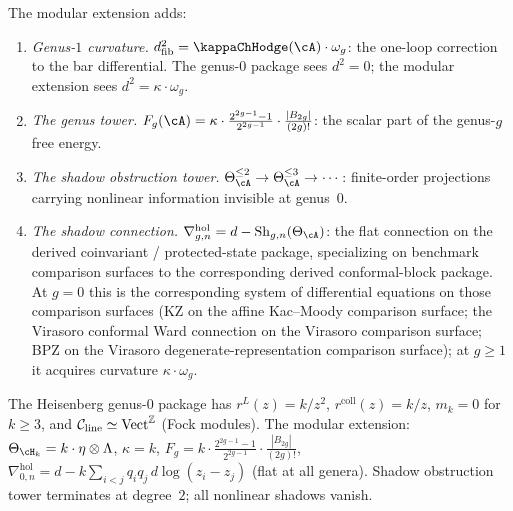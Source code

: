 \begin{construction}
The modular extension adds:
\begin{enumerate}[label=\textup{(\roman*)}]
\item \emph{Genus-$1$ curvature.}
 $d_{\mathrm{fib}}^2=\kappaChHodge(\cA)\cdot\omega_g$: the
 one-loop correction to the bar differential. The genus-$0$
 package sees $d^2=0$; the modular extension sees
 $d^2=\kappa\cdot\omega_g$.
\item \emph{The genus tower.}
 $F_g(\cA)=\kappa\cdot \tfrac{2^{2g-1}-1}{2^{2g-1}}\cdot\tfrac{|B_{2g}|}{(2g)!}$: the scalar
 part of the genus-$g$ free energy.
\item \emph{The shadow obstruction tower.}
 $\Theta_\cA^{\le 2}\to\Theta_\cA^{\le 3}\to\cdots$:
 finite-order projections carrying nonlinear
 information invisible at genus~$0$.
\item \emph{The shadow connection.}
 $\nabla^{\mathrm{hol}}_{g,n}=d-\mathrm{Sh}_{g,n}(\Theta_\cA)$:
 the flat connection on the derived coinvariant /
 protected-state package, specializing on benchmark
 comparison surfaces to the corresponding derived
 conformal-block package. At
 $g=0$ this is the corresponding system of differential equations
 on those comparison surfaces (KZ on the affine Kac--Moody
 comparison surface; the Virasoro conformal Ward connection on the
 Virasoro comparison surface; BPZ on the Virasoro
 degenerate-representation comparison surface);
 at $g\ge 1$ it acquires curvature $\kappa\cdot\omega_g$.
\end{enumerate}
\end{construction}

\begin{computation}
\label{comp:vol2-heisenberg-modular-extension}
The Heisenberg genus-$0$ package has
$r^L(z)=k/z^2$, $r^{\mathrm{coll}}(z)=k/z$, $m_k=0$ for $k\ge 3$, and
$\mathcal C_{\mathrm{line}}\simeq\mathrm{Vect}^{\mathbb{Z}}$ (Fock modules).
The modular extension:
$\Theta_{\cH_k}=k\cdot\eta\otimes\Lambda$,
$\kappa=k$,
$F_g=k\cdot \tfrac{2^{2g-1}-1}{2^{2g-1}}\cdot\tfrac{|B_{2g}|}{(2g)!}$,
$\nabla^{\mathrm{hol}}_{0,n}
=d-k\sum_{i<j}q_iq_j\,d\log(z_i-z_j)$
(flat at all genera).
Shadow obstruction tower terminates at degree~$2$; all nonlinear
shadows vanish.
\end{computation}

